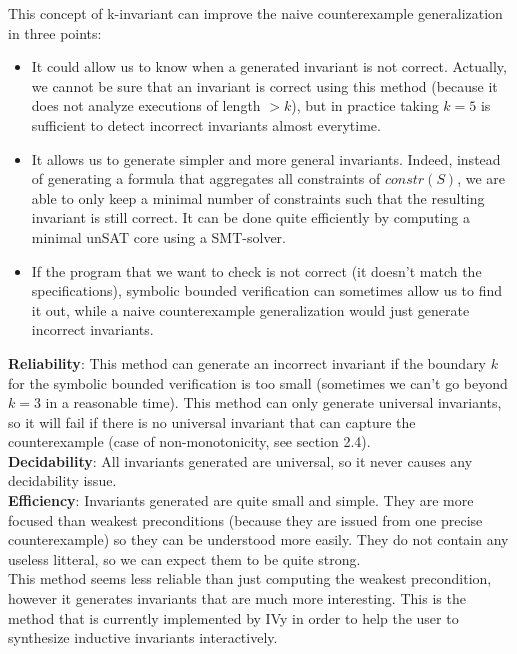 \documentclass[11pt,a4paper,oldfontcommands,openany]{memoir}
\begin{document}
    This concept of k-invariant can improve the naive counterexample generalization in three points:
    \begin{itemize}
        \item It could allow us to know when a generated invariant is not correct.
        Actually, we cannot be sure that an invariant is correct using this method (because it does not analyze executions of length \(> k\)),
        but in practice taking \(k=5\) is sufficient to detect incorrect invariants almost everytime.
        \item It allows us to generate simpler and more general invariants. Indeed, instead of generating a formula that
        aggregates all constraints of \(constr(S)\), we are able to only keep a minimal number of constraints
        such that the resulting invariant is still correct. It can be done quite efficiently by computing a minimal unSAT core using a SMT-solver.
        \item If the program that we want to check is not correct (it doesn't match the specifications), symbolic bounded verification
        can sometimes allow us to find it out, while a naive counterexample generalization would just generate incorrect invariants.
    \end{itemize}\hfill

    \textbf{Reliability}: This method can generate an incorrect invariant if the boundary \(k\) for the symbolic bounded verification
    is too small (sometimes we can't go beyond \(k=3\) in a reasonable time). This method can only generate universal invariants,
    so it will fail if there is no universal invariant that can capture the counterexample (case of non-monotonicity, see section 2.4).\\

    \textbf{Decidability}: All invariants generated are universal, so it never causes any decidability issue.\\

    \textbf{Efficiency}: Invariants generated are quite small and simple. They are more focused than weakest preconditions
    (because they are issued from one precise counterexample) so they can be understood more easily.
    They do not contain any useless litteral, so we can expect them to be quite strong.\\

    This method seems less reliable than just computing the weakest precondition, however it generates invariants that are much more interesting.
    This is the method that is currently implemented by IVy in order to help the user to synthesize inductive invariants interactively.
\end{document}

